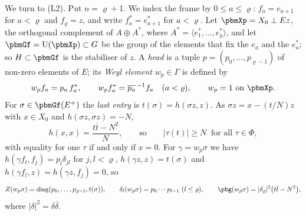 \documentclass[10pt]{amsart}
\theoremstyle{definition}
\theoremstyle{remark}
\providecommand{\auPl}{\Phi}
\providecommand{\auU}{\mathrm U}
\providecommand{\aubar}[1]{\overline{#1}}
\begin{document}
We turn to \textup{(L2)}. Put $n=\varrho+1$. We index the frame by $0\le a\le\varrho$:
$f_a=e_{a+1}$ for $a<\varrho$ and $f_\varrho=z$, and write $f_a^*=e_{a+1}^*$ for $a<\varrho$. Let
$\pbmXp=X_0\perp Ez$, the orthogonal complement of $A\oplus A^*$, where $A^*=\langle e_1^*,\dots,
e_\varrho^*\rangle$, and let $\pbmGf=\auU(\pbmXp)\subset G$ be the group of the elements that fix
the $e_a$ and the $e_a^*$; so $H\subset\pbmGf$ is the stabiliser of $z$. A \emph{head} is a tuple
$p=(p_0,\dots,p_{\varrho-1})$ of non-zero elements of $E$; its \emph{Weyl element} $w_p\in\Gamma$
is defined by
\[
w_pf_a=p_a\,f_a^*,\qquad w_pf_a^*=\aubar{p_a}^{\,-1}f_a\quad(a<\varrho),\qquad w_p=1\text{ on }\pbmXp .
\]
For $\sigma\in\pbmGf(E^+)$ the \emph{last entry} is $t(\sigma)=h(\sigma z,z)$. As $\sigma z=x-
(t/N)z$ with $x\in X_0$ and $h(\sigma z,\sigma z)=-N$,
\begin{equation}\label{pbm:eq-last}
h(x,x)=\frac{t\aubar t-N^2}N,\qquad\text{so}\qquad|\tau(t)|\ge N\ \text{ for all }\tau\in\auPl ,
\end{equation}
with equality for one $\tau$ if and only if $x=0$. For $\gamma=w_p\sigma$ we have $h(\gamma f_l,f_j)
=p_l\delta_{jl}$ for $j,l<\varrho$, $h(\gamma z,z)=t(\sigma)$ and $h(\gamma f_l,z)=h(\gamma z,f_j)=0$,
so
\begin{equation}\label{pbm:eq-Z}
Z(w_p\sigma)=\operatorname{diag}(p_0,\dots,p_{\varrho-1},t(\sigma)),\qquad\delta_l(w_p\sigma)=p_0\cdots
p_{l-1}\ (l\le\varrho),\qquad\pbg(w_p\sigma)=|\delta_\varrho|^2\bigl(t\aubar t-N^2\bigr),
\end{equation}
where $|\delta|^2=\delta\aubar\delta$.
\end{document}
